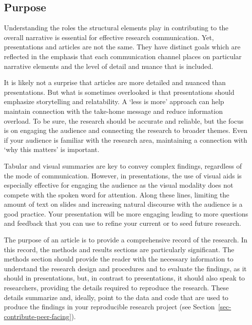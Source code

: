 \documentclass[
  letterpaper,
  krantz1]{latex/krantz-mod}
\theoremstyle{definition}
\theoremstyle{definition}
\theoremstyle{remark}
\begin{document}
\subsection{Purpose}\label{sec-contribute-public-purpose}

Understanding the roles the structural elements play in contributing to
the overall narrative is essential for effective research communication.
Yet, presentations and articles are not the same. They have distinct
goals which are reflected in the emphasis that each communication
channel places on particular narrative elements and the level of detail
and nuance that is included.

It is likely not a surprise that articles are more detailed and nuanced
than presentations. But what is sometimes overlooked is that
presentations should emphasize storytelling and relatability. A `less is
more' approach can help maintain connection with the take-home message
and reduce information overload. To be sure, the research should be
accurate and reliable, but the focus is on engaging the audience and
connecting the research to broader themes. Even if your audience is
familiar with the research area, maintaining a connection with `why this
matters' is important.

Tabular and visual summaries are key to convey complex findings,
regardless of the mode of communication. However, in presentations, the
use of visual aids is especially effective for engaging the audience as
the visual modality does not compete with the spoken word for attention.
Along these lines, limiting the amount of text on slides and increasing
natural discourse with the audience is a good practice. Your
presentation will be more engaging leading to more questions and
feedback that you can use to refine your current or to seed future
research.

The purpose of an article is to provide a comprehensive record of the
research. In this record, the methods and results sections are
particularly significant. The methods section should provide the reader
with the necessary information to understand the research
design and procedures and to evaluate the
findings, as it should in presentations, but, in contrast to
presentations, it should also speak to researchers, providing the
details required to reproduce the research. These details summarize and,
ideally, point to the data and code that are used to produce the
findings in your reproducible research project (see
Section~\ref{sec-contribute-peer-facing}).
\end{document}
